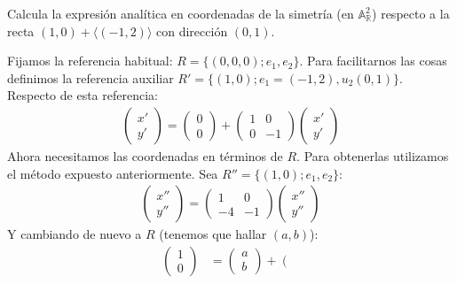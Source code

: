 \documentclass[14pt]{book}
\begin{document}
\begin{ej}
	Calcula la expresión analítica en coordenadas de la simetría (en $\mathbb{A}_\mathbb{R}^2$) respecto a la recta $(1, 0) + \langle (-1, 2) \rangle$ con dirección $(0, 1)$.
	
	Fijamos la referencia habitual: $R = \{(0,0,0); e_1, e_2\}$. Para facilitarnos las cosas definimos la referencia auxiliar $R' = \{(1,0); e_1 = (-1,2), u_2(0, 1)\}$. Respecto de esta referencia:
	\begin{align*}
		\left(\begin{array}{c}
		x' \\ y'
		\end{array}\right) =
		\left(\begin{array}{c}
		0 \\ 0
		\end{array}\right) + 
		\left(\begin{array}{cc}
		1 & 0 \\ 0 & -1
		\end{array}\right)
		\left(\begin{array}{c}
		x' \\ y'
		\end{array}\right)
	\end{align*}
	Ahora necesitamos las coordenadas en términos de $R$. Para obtenerlas utilizamos el método expuesto anteriormente. Sea $R'' = \{(1,0); e_1, e_2\}$:
	\begin{align*}
	\left(\begin{array}{c}
	x'' \\ y''
	\end{array}\right) = 
	\left(\begin{array}{cc}
	1 & 0 \\ -4 & -1
	\end{array}\right)
	\left(\begin{array}{c}
	x'' \\ y''
	\end{array}\right)
	\end{align*}
	Y cambiando de nuevo a $R$ (tenemos que hallar $(a, b)$):
	\begin{align*}
	\left(\begin{array}{c}
	1 \\ 0
	\end{array}\right) &= 
	\left(\begin{array}{c}
	a \\ b
	\end{array}\right) + 
	\left(\begin{array}{cc}

\end{array}
\end{align*}
\end{ej}
\end{document}

